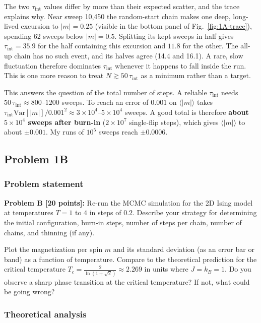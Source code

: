 \documentclass[11pt]{article}
\numberwithin{equation}{section}
\begin{document}
The two $\tau_\text{int}$ values differ by more than their expected scatter, and the trace explains why. Near sweep 10{,}450 the random-start chain makes one deep, long-lived excursion to $|m|=0.25$ (visible in the bottom panel of Fig.~\ref{fig:1A-trace}), spending 62 sweeps below $|m|=0.5$. Splitting its kept sweeps in half gives $\tau_\text{int}=35.9$ for the half containing this excursion and $11.8$ for the other. The all-up chain has no such event, and its halves agree (14.4 and 16.1). A rare, slow fluctuation therefore dominates $\tau_\text{int}$ whenever it happens to fall inside the run. This is one more reason to treat $N\gtrsim50\,\tau_\text{int}$ as a minimum rather than a target.

This answers the question of the total number of steps. A reliable $\tau_\text{int}$ needs $50\,\tau_\text{int}\approx800$--$1200$ sweeps. To reach an error of $0.001$ on $\langle|m|\rangle$ takes $\tau_\text{int}\mathrm{Var}[|m|]/0.001^2\approx3\times10^4$--$5\times10^4$ sweeps. A good total is therefore \textbf{about $5\times10^4$ sweeps after burn-in} ($2\times10^7$ single-flip steps), which gives $\langle|m|\rangle$ to about $\pm0.001$. My runs of $10^5$ sweeps reach $\pm0.0006$.

\subsection{Problem 1B}

\subsubsection*{Problem statement}
\begin{statement}
\textbf{Problem B [20 points]:} Re-run the MCMC simulation for the 2D Ising model at temperatures $T=1$ to $4$ in steps of $0.2$. Describe your strategy for determining the initial configuration, burn-in steps, number of steps per chain, number of chains, and thinning (if any).

Plot the magnetization per spin $m$ and its standard deviation (as an error bar or band) as a function of temperature. Compare to the theoretical prediction for the critical temperature $T_c=\frac{2}{\ln(1+\sqrt2)}\approx2.269$ in units where $J=k_B=1$. Do you observe a sharp phase transition at the critical temperature? If not, what could be going wrong?
\end{statement}

\subsubsection*{Theoretical analysis}
\end{document}
